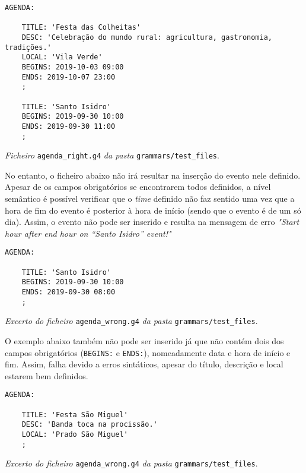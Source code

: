\begin{framed}
\begin{lstlisting}[language=ANTLR]
    AGENDA:

    TITLE: 'Festa das Colheitas'
    DESC: 'Celebração do mundo rural: agricultura, gastronomia, tradições.'
    LOCAL: 'Vila Verde'
    BEGINS: 2019-10-03 09:00
    ENDS: 2019-10-07 23:00
    ;
    
    TITLE: 'Santo Isidro'
    BEGINS: 2019-09-30 10:00
    ENDS: 2019-09-30 11:00
    ;
\end{lstlisting}
\end{framed}
\begin{center}
\textit{Ficheiro} \texttt{agenda\_right.g4} \textit{da pasta} \texttt{grammars/test\_files}.
\end{center}

No entanto, o ficheiro abaixo não irá resultar na inserção do evento nele definido. Apesar de os campos obrigatórios se encontrarem todos definidos, a nível semântico é possível verificar que o \textit{time} definido não faz sentido uma vez que a hora de fim do evento é posterior à hora de início (sendo que o evento é de um só dia). Assim, o evento não pode ser inserido e resulta na mensagem de erro \textit{"Start hour after end hour on ``Santo Isidro'' event!"}

\begin{framed}
\begin{lstlisting}[language=ANTLR]
    AGENDA:

    TITLE: 'Santo Isidro'
    BEGINS: 2019-09-30 10:00
    ENDS: 2019-09-30 08:00
    ;
\end{lstlisting}
\end{framed}
\begin{center}
\textit{Excerto do ficheiro} \texttt{agenda\_wrong.g4} \textit{da pasta} \texttt{grammars/test\_files}.
\end{center}

O exemplo abaixo também não pode ser inserido já que não contém dois dos campos obrigatórios (\texttt{BEGINS:} e \texttt{ENDS:}), nomeadamente data e hora de início e fim. Assim, falha devido a erros sintáticos, apesar do título, descrição e local estarem bem definidos.

\begin{framed}
\begin{lstlisting}[language=ANTLR]
    AGENDA:

    TITLE: 'Festa São Miguel'
    DESC: 'Banda toca na procissão.'
    LOCAL: 'Prado São Miguel'
    ;
\end{lstlisting}
\end{framed}
\begin{center}
\textit{Excerto do ficheiro} \texttt{agenda\_wrong.g4} \textit{da pasta} \texttt{grammars/test\_files}.
\end{center}

